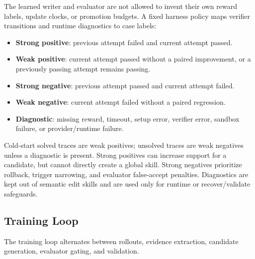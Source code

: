\documentclass{article}
\begin{document}
The learned writer and evaluator are not allowed to invent their own reward
labels, update clocks, or promotion budgets. A fixed harness policy maps
verifier transitions and runtime diagnostics to case labels:
\begin{itemize}
    \item \textbf{Strong positive}: previous attempt failed and current attempt
    passed.
    \item \textbf{Weak positive}: current attempt passed without a paired
    improvement, or a previously passing attempt remains passing.
    \item \textbf{Strong negative}: previous attempt passed and current attempt
    failed.
    \item \textbf{Weak negative}: current attempt failed without a paired
    regression.
    \item \textbf{Diagnostic}: missing reward, timeout, setup error, verifier
    error, sandbox failure, or provider/runtime failure.
\end{itemize}

Cold-start solved traces are weak positives; unsolved traces are weak
negatives unless a diagnostic is present. Strong positives can increase support
for a candidate, but cannot directly create a global skill. Strong negatives
prioritize rollback, trigger narrowing, and evaluator false-accept penalties.
Diagnostics are kept out of semantic edit skills and are used only for runtime
or recover/validate safeguards.

\subsection{Training Loop}

The training loop alternates between rollouts, evidence extraction, candidate
generation, evaluator gating, and validation.
\end{document}
